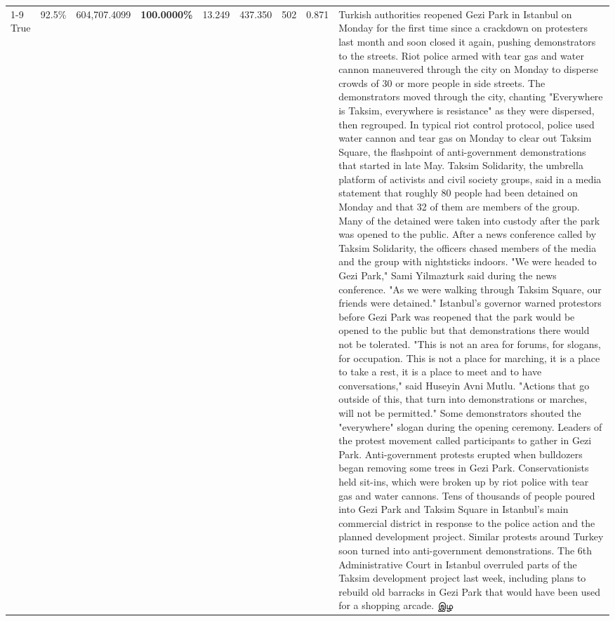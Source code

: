 \begin{table}[H]
\begin{tabular}{lllrlllll}
\cline{1-9}
True & 92.5\% & 604,707.4099 & \bfseries \color{red} 100.0000\% & 13.249 & 437.350 & 502 & 0.871 & Turkish authorities reopened Gezi Park in Istanbul on Monday for the first time since a crackdown on protesters last month and soon closed it again, pushing demonstrators to the streets. Riot police armed with tear gas and water cannon maneuvered through the city on Monday to disperse crowds of 30 or more people in side streets. The demonstrators moved through the city, chanting "Everywhere is Taksim, everywhere is resistance" as they were dispersed, then regrouped. In typical riot control protocol, police used water cannon and tear gas on Monday to clear out Taksim Square, the flashpoint of anti-government demonstrations that started in late May. Taksim Solidarity, the umbrella platform of activists and civil society groups, said in a media statement that roughly 80 people had been detained on Monday and that 32 of them are members of the group. Many of the detained were taken into custody after the park was opened to the public. After a news conference called by Taksim Solidarity, the officers chased members of the media and the group with nightsticks indoors. "We were headed to Gezi Park," Sami Yilmazturk said during the news conference. "As we were walking through Taksim Square, our friends were detained." Istanbul's governor warned protestors before Gezi Park was reopened that the park would be opened to the public but that demonstrations there would not be tolerated. "This is not an area for forums, for slogans, for occupation. This is not a place for marching, it is a place to take a rest, it is a place to meet and to have conversations," said Huseyin Avni Mutlu. "Actions that go outside of this, that turn into demonstrations or marches, will not be permitted." Some demonstrators shouted the "everywhere" slogan during the opening ceremony. Leaders of the protest movement called participants to gather in Gezi Park. Anti-government protests erupted when bulldozers began removing some trees in Gezi Park. Conservationists held sit-ins, which were broken up by riot police with tear gas and water cannons. Tens of thousands of people poured into Gezi Park and Taksim Square in Istanbul's main commercial district in response to the police action and the planned development project. Similar protests around Turkey soon turned into anti-government demonstrations. The 6th Administrative Court in Istanbul overruled parts of the Taksim development project last week, including plans to rebuild old barracks in Gezi Park that would have been used for a shopping arcade. இழ \\

\end{tabular}
\end{table}
